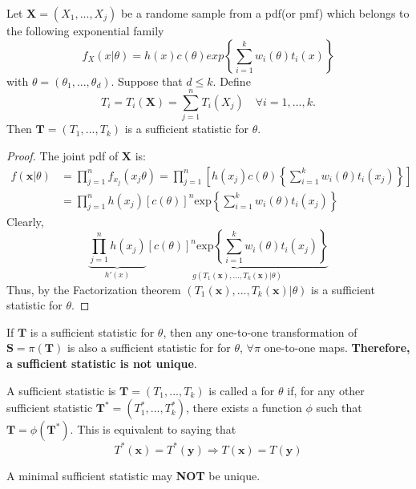 \begin{theorem}
    Let $\boldsymbol{X} = (X_1,...,X_j)$ be a randome sample from a pdf(or pmf) which belongs to the following exponential family
    $$
    f_X(x|\theta) = h(x)c(\theta)exp 
    \left \{ 
    \sum_{i=1}^{k}w_i(\theta)t_i(x)
    \right \}
    $$
    with $\theta = (\theta_1,...,\theta_d)$. Suppose that $d \leq k$. Define 
    $$T_i = T_i(\boldsymbol{X}) = \sum_{j=1}^{n}T_i(X_j)
    \quad \forall i=1,...,k.$$
    Then $\boldsymbol{T} = (T_1,...,T_k)$ is a sufficient statistic for $\theta$.
\end{theorem}
\begin{proof}
    The joint pdf of $\boldsymbol{X}$ is:
    \begin{align*}
    f(\boldsymbol{x}|\theta) & = 
    \prod_{j=1}^{n}f_{x_j}(x_j \theta) 
    = \prod_{j=1}^{n} \left[
    h(x_j)c(\theta) \left \{
    \sum_{i=1}^{k}w_i(\theta)t_i(x_j)
    \right\}
    \right ] \\
    & = \prod_{j=1}^{n}h(x_j)[c(\theta)]^n \mathrm{exp} \left \{
    \sum_{i=1}^{k}w_i(\theta)t_i(x_j)
    \right\}
    \end{align*}
    Clearly, 
    $$
    \underbrace{ \prod_{j=1}^{n}h(x_j)}_{h'(x)}
    \underbrace{[c(\theta)]^n\mathrm{exp} \left \{
    \sum_{i=1}^{k}w_i(\theta)t_i(x_j)
    \right\}}_{g(T_1(\boldsymbol{x}),...,T_k(\boldsymbol{x})|\theta)}
    $$
    Thus, by the Factorization theorem $(T_1(\boldsymbol{x}),...,T_k(\boldsymbol{x})|\theta)$ is a sufficient statistic for $\theta$.
\end{proof}
 If $\boldsymbol{T}$ is a sufficient statistic for $\theta$, then any one-to-one transformation of $\boldsymbol{S} = \pi(\boldsymbol{T})$ is also a sufficient statistic for for $\theta$, $\forall \pi$ one-to-one maps. \textbf{Therefore, a sufficient statistic is not unique}. 
\begin{definition}
    A sufficient statistic is $\boldsymbol{T} = (T_1,...,T_k)$ is called a  for $\theta$ if, for any other sufficient statistic $\boldsymbol{T}^* = (T_1^*,...,T_k^*)$, there exists a function $\phi$ such that $\boldsymbol{T} = \phi(\boldsymbol{T}^*)$. This is equivalent to saying that
    $$
    T^*(\boldsymbol{x}) = T^*(\boldsymbol{y}) \Longrightarrow T(\boldsymbol{x}) = T(\boldsymbol{y})
    $$
\end{definition}
 A minimal sufficient statistic may \textbf{NOT} be unique.